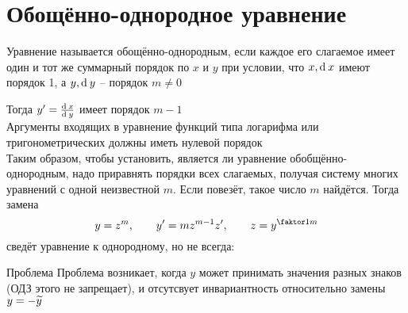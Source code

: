 \section{Обощённо-однородное уравнение}

\begin{definition}
    Уравнение называется обощённо-однородным, если каждое его слагаемое имеет один и тот же суммарный порядок по $ x $ и $ y $ при условии, что $ x, \operatorname{d}^{} x $ имеют порядок 1, а $ y, \operatorname{d}^{} y $ -- порядок $ m \ne 0 $
\end{definition}
Тогда $ y' = \frac{\operatorname{d}^{} x}{\operatorname{d}^{} y} $ имеет порядок $ m - 1 $ \\
Аргументы входящих в уравнение функций типа логарифма или тригонометрических должны иметь нулевой порядок \\
Таким образом, чтобы установить, является ли уравнение обобщённо-однородным, надо приравнять порядки всех слагаемых, получая систему многих уравнений с одной неизвестной $ m $. Если повезёт, такое число $ m $ найдётся. Тогда замена
$$ y = z^m, \qquad y' = mz^{m - 1}z', \qquad z = y^{\faktor1m} $$
сведёт уравнение к однородному, но не всегда:

\begin{undefthm}{Проблема}
    Проблема возникает, когда $ y $ может принимать значения разных знаков (ОДЗ этого не запрещает), и отсутсвует инвариантность относительно замены $ y = -\widetilde{y} $
\end{undefthm}

